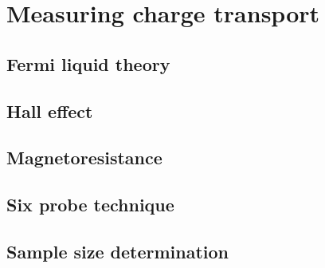 
\section{Measuring charge transport}

\subsection{Fermi liquid theory}

\subsection{Hall effect}

\subsection{Magnetoresistance}

\subsection{Six probe technique}

\subsection{Sample size determination}


